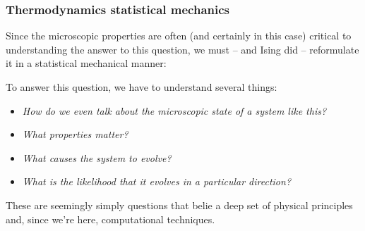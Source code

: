 \documentclass[hyperref={colorlinks=true}]{beamer}
\begin{document}
\begin{frame}%
  \frametitle{Thermodynamics \ra statistical mechanics}
  
  Since the microscopic properties are often (and certainly in this case) critical to understanding the answer to this question, we must -- and Ising did -- reformulate it in a statistical mechanical manner:
  
  \vspace{0.1cm}
  
  \begin{ucblock}{}
  \end{ucblock}
  
  \vspace{0.1cm}
  
  To answer this question, we have to understand several things:
  
  \begin{itemize}
    \item \textit{How do we even talk about the microscopic state of a system like this?}
    \item \textit{What properties matter?}
    \item \textit{What causes the system to evolve?}
    \item \textit{What is the likelihood that it evolves in a particular direction?}
  \end{itemize}

  These are seemingly simply questions that belie a deep set of physical principles and, since we're here, computational techniques.

\end{frame}

\end{document}
